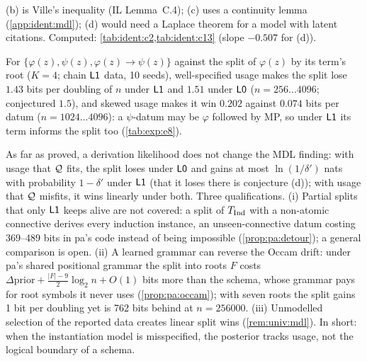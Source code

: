 \noindent (b) is Ville's inequality (IL Lemma~C.4); (c) uses a continuity lemma (\cref{app:ident:mdl}); (d) would need a Laplace theorem for a model with latent citations. Computed: \cref{tab:ident:c2,tab:ident:c13} (slope $-0.507$ for (d)).

\begin{remark}\identbrk{}\label{rem:ident:e8}
For $\{\varphi(z),\psi(z),\varphi(z)\to\psi(z)\}$ against the split of $\varphi(z)$ by its term's root ($K=4$; chain $\mathord{\mathsf{L1}}$ data, 10 seeds), well-specified usage makes the split lose $1.43$ bits per doubling of $n$ under $\mathord{\mathsf{L1}}$ and $1.51$ under $\mathord{\mathsf{L0}}$ ($n=256\ldots4096$; conjectured $1.5$), and skewed usage makes it win $0.202$ against $0.074$ bits per datum ($n=1024\ldots4096$): a $\psi$-datum may be $\varphi$ followed by MP, so under $\mathord{\mathsf{L1}}$ its term informs the split too (\cref{tab:exp:e8}).
\end{remark}

\begin{remark}\identbrk{}\label{rem:ident:mdl}
As far as proved, a derivation likelihood does not change the MDL finding: with usage that $\mathcal{Q}$ fits, the split loses under $\mathord{\mathsf{L0}}$ and gains at most $\ln(1/\delta')$ nats with probability $1-\delta'$ under $\mathord{\mathsf{L1}}$ (that it loses there is conjecture (d)); with usage that $\mathcal{Q}$ misfits, it wins linearly under both. Three qualifications. (i) Partial splits that only $\mathord{\mathsf{L1}}$ keeps alive are not covered: a split of $T_{\mathrm{Ind}}$ with a non-atomic connective derives every induction instance, an unseen-connective datum costing 369--489 bits in pa's code instead of being impossible (\cref{prop:pa:detour}); a general comparison is open. (ii) A learned grammar can reverse the Occam drift: under pa's shared positional grammar the split into roots $F$ costs $\Delta\mathrm{prior}+\frac{|F|-9}2\log_2n+O(1)$ bits more than the schema, whose grammar pays for root symbols it never uses (\cref{prop:pa:occam}); with seven roots the split gains 1 bit per doubling yet is 762 bits behind at $n=256000$. (iii) Unmodelled selection of the reported data creates linear split wins (\cref{rem:univ:mdl}). In short: when the instantiation model is misspecified, the posterior tracks usage, not the logical boundary of a schema.
\end{remark}

